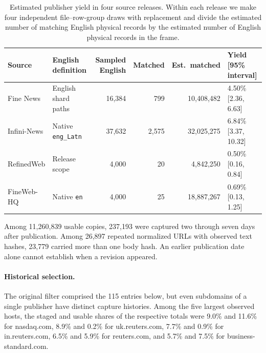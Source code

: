 \begin{table}[t]
  \centering
  \small
  \setlength{\tabcolsep}{4pt}
  \caption{Estimated publisher yield in four source releases. Within each
    release we make four independent file--row-group draws with replacement
    and divide the estimated number of matching English physical records
  by the estimated number of English physical records in the frame.}
  \label{tab:app-source}
  \begin{tabular}{llrrrl}
    \toprule
    Source & English definition & Sampled English & Matched &
    Est.\ matched & Yield [95\% interval] \\
    \midrule
    Fine News & English shard paths & 16,384 & 799 & 10,408,482 &
    4.50\% [2.36, 6.63] \\
    Infini-News & Native \texttt{eng\_Latn} & 37,632 & 2,575 &
    32,025,275 & 6.84\% [3.37, 10.32] \\
    RefinedWeb & Release scope & 4,000 & 20 & 4,842,250 & 0.50\% [0.16, 0.84] \\
    FineWeb-HQ & Native \texttt{en} & 4,000 & 25 & 18,887,267 &
    0.69\% [0.13, 1.25] \\
    \bottomrule
  \end{tabular}
\end{table}

Among 11,260,839 usable copies, 237,193 were captured two through seven
days after publication. Among 26,897 repeated normalized URLs with
observed text hashes, 23,779 carried more than one body hash. An
earlier publication date alone cannot establish when a revision appeared.

\paragraph{Historical selection.}
The original filter comprised the 115 entries below, but even subdomains
of a single publisher have distinct capture histories. Among the five largest
observed hosts, the staged and usable shares of the respective totals
were 9.0\% and 11.6\% for nasdaq.com, 8.9\% and 0.2\% for uk.reuters.com,
7.7\% and 0.9\% for in.reuters.com, 6.5\% and 5.9\% for reuters.com,
and 5.7\% and 7.5\% for business-standard.com.

